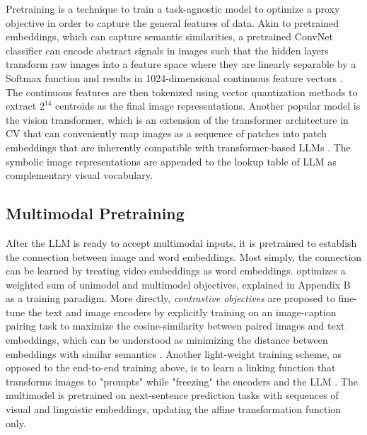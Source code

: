 \documentclass[11pt]{article}
\begin{document}
Pretraining is a technique to train a task-agnostic model to optimize a proxy objective in order to capture the general features of data. Akin to pretrained embeddings, which can capture semantic similarities, a pretrained ConvNet classifier can encode abstract signals in images such that the hidden layers transform raw images into a feature space where they are linearly separable by a Softmax function and results in 1024-dimensional continuous feature vectors \citep{DBLP:conf/iccv/SunMV0S19}. The continuous features are then tokenized using vector quantization methods to extract $2^{14}$ centroids as the final image representations. Another popular model is the vision transformer, which is an extension of the transformer architecture in CV that can conveniently map images as a sequence of patches into patch embeddings that are inherently compatible with transformer-based LLMs \citep{DBLP:conf/iclr/DosovitskiyB0WZ21, DBLP:conf/icml/DriessXSLCIWTVY23, DBLP:conf/icml/RadfordKHRGASAM21}. The symbolic image representations are appended to the lookup table of LLM as complementary visual vocabulary. 

\subsection{Multimodal Pretraining}
After the LLM is ready to accept multimodal inputs, it is pretrained to establish the connection between image and word embeddings. Most simply, the connection can be learned by treating video embeddings as word embeddings. \citet{DBLP:conf/iccv/SunMV0S19} optimizes a weighted sum of unimodel and multimodel objectives, explained in Appendix B as a training paradigm. More directly, \textit{contrastive objectives} are proposed to fine-tune the text and image encoders by explicitly training on an image-caption pairing task to maximize the cosine-similarity between paired images and text embeddings, which can be understood as minimizing the distance between embeddings with similar semantics \citep{DBLP:conf/icml/RadfordKHRGASAM21}. Another light-weight training scheme, as opposed to the end-to-end training above, is to learn a linking function that transforms images to "prompts" while "freezing" the encoders and the LLM \citep{DBLP:conf/icml/DriessXSLCIWTVY23}. The multimodel is pretrained on next-sentence prediction tasks with sequences of visual and linguistic embeddings, updating the affine transformation function only.
\end{document}
